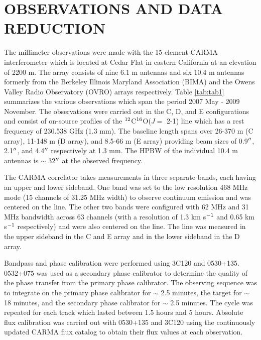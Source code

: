 \documentclass[iop]{emulateapj}
\begin{document}
\section{OBSERVATIONS AND DATA REDUCTION}

The millimeter observations were made with the 15 element CARMA interferometer \citep{2004ASPC..314..768S} which is located at Cedar Flat in eastern California at an elevation of 2200 m. The array consists of nine 6.1 m antennas and six 10.4 m antennas formerly from the Berkeley Illinois Maryland Association (BIMA) and the Owens Valley Radio Observatory (OVRO) arrays respectively. Table \ref{tab:tab1} summarizes the various observations which span the period 2007 May - 2009 November. The observations were carried out in the C, D, and E configurations and consist of on-source profiles of the $\rm{{}^{12}}$C$\rm{{}^{16}}$O($J=$ 2-1) line which has a rest frequency of 230.538 GHz (1.3 mm). The baseline length spans over 26-370 m (C array), 11-148 m (D array), and 8.5-66 m (E array) providing beam sizes of 0.9$\mbox{$^{\prime\prime}$}$, 2.1$\mbox{$^{\prime\prime}$}$, and 4.4$\mbox{$^{\prime\prime}$}$ respectively at 1.3 mm. The HPBW of the individual 10.4 m antennas is $\sim$ 32$\mbox{$^{\prime\prime}$}$ at the observed frequency.

The CARMA correlator takes measurements in three separate bands, each having an upper and lower sideband. One band was set to the low resolution 468 MHz mode (15 channels of 31.25 MHz width) to observe continuum emission and was centered on the line. The other two bands were configured with 62 MHz and 31 MHz bandwidth across 63 channels (with a resolution of 1.3 km s$\rm{{}^{-1}}$ and 0.65 km s$\rm{{}^{-1}}$ respectively) and were also centered on the line. The line was measured in the upper sideband in the C and E array and in the lower sideband in the D array.

Bandpass and phase calibration were performed using 3C120 and 0530+135. 0532+075 was used as a secondary phase calibrator to determine the quality of the phase transfer from the primary phase calibrator. The observing sequence was to integrate on the primary phase calibrator for $\sim$ 2.5 minutes, the target for $\sim$ 18 minutes, and the secondary phase calibrator for $\sim$ 2.5 minutes. The cycle was repeated for each track which lasted between 1.5 hours and 5 hours. Absolute flux calibration was carried out with 0530+135 and 3C120 using the continuously updated CARMA flux catalog to obtain their flux values at each observation.
\end{document}

